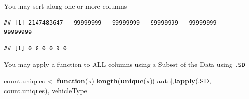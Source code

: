 \documentclass[]{book}
\newenvironment{Shaded}{\begin{snugshade}}{\end{snugshade}}
\newcommand{\KeywordTok}[1]{\textcolor[rgb]{0.13,0.29,0.53}{\textbf{#1}}}
\newcommand{\StringTok}[1]{\textcolor[rgb]{0.31,0.60,0.02}{#1}}
\newcommand{\CommentTok}[1]{\textcolor[rgb]{0.56,0.35,0.01}{\textit{#1}}}
\newcommand{\ControlFlowTok}[1]{\textcolor[rgb]{0.13,0.29,0.53}{\textbf{#1}}}
\newcommand{\OperatorTok}[1]{\textcolor[rgb]{0.81,0.36,0.00}{\textbf{#1}}}
\newcommand{\NormalTok}[1]{#1}
\theoremstyle{definition}
\theoremstyle{definition}
\theoremstyle{definition}
\theoremstyle{remark}
\begin{document}
You may sort along one or more columns

\begin{Shaded}
\end{Shaded}

\begin{verbatim}
## [1] 2147483647   99999999   99999999   99999999   99999999   99999999
\end{verbatim}

\begin{Shaded}
\end{Shaded}

\begin{verbatim}
## [1] 0 0 0 0 0 0
\end{verbatim}

You may apply a function to ALL columns using a Subset of the Data using
\texttt{.SD}

\begin{Shaded}
\begin{Highlighting}[]
\NormalTok{count.uniques <-}\StringTok{ }\ControlFlowTok{function}\NormalTok{(x) }\KeywordTok{length}\NormalTok{(}\KeywordTok{unique}\NormalTok{(x))}
\NormalTok{auto[,}\KeywordTok{lapply}\NormalTok{(.SD, count.uniques), vehicleType]}
\end{Highlighting}
\end{Shaded}
\end{document}
